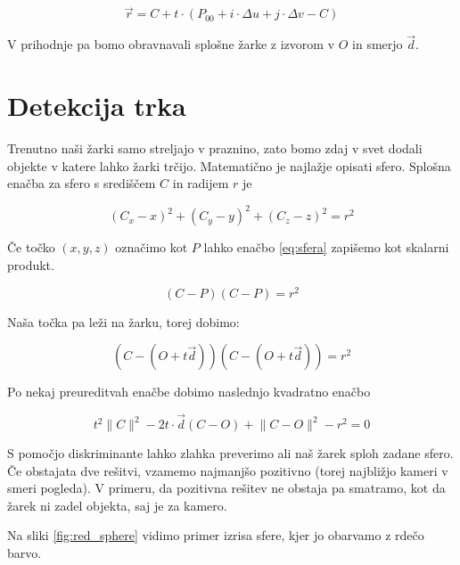 \documentclass[12pt, a4paper]{article}
\begin{document}
\begin{equation}
	\vec{r} = C + t \cdot (P_{00} + i \cdot \Delta u + j \cdot \Delta v - C)
\end{equation}

V prihodnje pa bomo obravnavali splošne žarke z izvorom v $O$ in smerjo $\vec{d}$.

\section{Detekcija trka}

Trenutno naši žarki samo streljajo v praznino, zato bomo zdaj v svet dodali objekte v katere lahko žarki trčijo.
Matematično je najlažje opisati sfero. Splošna enačba za sfero s središčem $C$ in radijem $r$ je

\begin{equation}
	\label{eq:sfera}
	(C_{x} - x)^2  + (C_{y} - y)^2  + (C_{z} - z)^2  = r^2
\end{equation}

Če točko $(x,y,z)$ označimo kot $P$ lahko enačbo \ref{eq:sfera} zapišemo kot skalarni produkt.

\begin{equation}
	(C - P)(C - P) = r^2
\end{equation}

Naša točka pa leži na žarku, torej dobimo:

\begin{equation}
	(C - (O + t \vec{d}))(C - (O + t \vec{d})) = r^2
\end{equation}

Po nekaj preureditvah enačbe dobimo naslednjo kvadratno enačbo

\begin{equation}
	t^2 \lVert C \rVert ^2  - 2 t \cdot \vec{d} (C - O) + \lVert C - O \rVert ^2  - r^2 = 0
\end{equation}

S pomočjo diskriminante lahko zlahka preverimo ali naš žarek sploh zadane sfero. Če obstajata dve rešitvi, vzamemo
najmanjšo pozitivno (torej najbližjo kameri v smeri pogleda). V primeru, da pozitivna rešitev ne obstaja pa
smatramo, kot da žarek ni zadel objekta, saj je za kamero.

Na sliki \ref{fig:red_sphere} vidimo primer izrisa sfere, kjer jo obarvamo z rdečo barvo.
\end{document}
